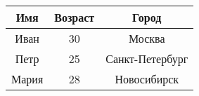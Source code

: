 \begin{tabular}{ccc}
\hline
Имя & Возраст & Город \\
\hline
Иван & 30 & Москва \\
\hline
Петр & 25 & Санкт-Петербург \\
\hline
Мария & 28 & Новосибирск \\
\hline
\end{tabular}